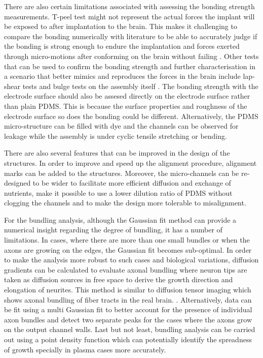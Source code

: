 \quad There are also certain limitations associated with assessing the bonding strength measurements. T-peel test might not represent the actual forces the implant will be exposed to after implantation to the brain. This makes it challenging to compare the bonding numerically with literature to be able to accurately judge if the bonding is strong enough to endure the implantation and forces exerted through micro-motions after conforming on the brain without failing \cite{sridharan2013long}. Other tests that can be used to confirm the bonding strength and further characterisation in a scenario that better mimics and reproduces the forces in the brain include lap-shear tests and bulge tests on the assembly itself \cite{sofla2010pdms} \cite{thangawng2007ultra}. The bonding strength with the electrode surface should also be assesed directly on the electrode surface rather than plain PDMS. This is because the surface properties and roughness of the electrode surface so does the bonding could be different. Alternatively, the PDMS micro-structure can be filled with dye and the channels can be observed for leakage while the assembly is under cyclic tensile stretching or bending.

\quad There are also several features that can be improved in the design of the structures. In order to improve and speed up the alignment procedure, alignment marks can be added to the structures. Moreover, the micro-channels can be re-designed to be wider to facilitate more efficient diffusion and exchange of nutrients, make it possible to use a lower dilution ratio of PDMS without clogging the channels and to make the design more tolerable to misalignment.

\quad For the bundling analysis, although the Gaussian fit method can provide a numerical insight regarding the degree of bundling, it has a number of limitations. In cases, where there are more than one small bundles or when the axons are growing on the edges, the Gaussian fit becomes sub-optimal. In order to make the analysis more robust to such cases and biological variations, diffusion gradients can be calculated to evaluate axonal bundling where neuron tips are taken as diffusion sources in free space to derive the growth direction and elongation of neurites. This method is similar to diffusion tensor imaging which shows axonal bundling of fiber tracts in the real brain. \cite{marinov2020computational}. Alternatively, data can be fit using a multi Gaussian fit to better account for the presence of individual axon bundles and detect two separate peaks for the cases where the axons grow on the output channel walls. Last but not least, bundling analysis can be carried out using a point density function which can potentially identify the spreadness of growth specially in plasma cases more accurately. \cite{pajevic2013optimum}

